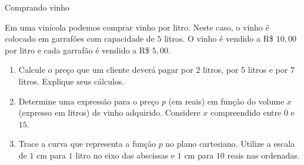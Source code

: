 \begin{task}{Comprando vinho}

Em uma vinícola podemos comprar vinho por litro. Neste caso, o vinho é colocado em garrafões com capacidade de \(5\) litros. O vinho é vendido a R\$ \(10,00\) por litro e cada garrafão é vendido a R\$ \(5,00\).
\begin{enumerate}
\item {} 
Calcule o preço que um cliente deverá pagar por \(2\) litros, por \(5\) litros e por \(7\) litros. Explique seus cálculos.

\item {} 
Determine uma expressão para o preço \(p\) (em reais) em função do volume \(x\) (expresso em litros) de vinho adquirido. Considere \(x\) compreendido entre \(0\) e \(15\).

\item {} 
Trace a curva que representa a função \(p\) no plano cartesiano. Utilize a escala de \(1\) cm para \(1\) litro no eixo das abscissas e \(1\) cm para \(10\) reais nas ordenadas.

\end{enumerate}
\end{task}

